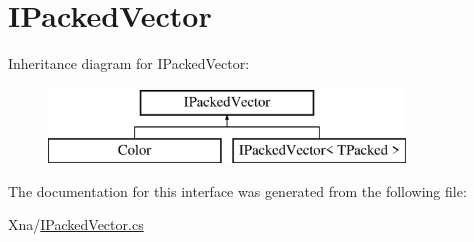 \hypertarget{interfaceMicrosoft_1_1Xna_1_1Framework_1_1IPackedVector}{}\section{I\+Packed\+Vector}
\label{interfaceMicrosoft_1_1Xna_1_1Framework_1_1IPackedVector}
Inheritance diagram for I\+Packed\+Vector\+:\begin{figure}[H]
\begin{center}
\leavevmode
\includegraphics[height=2.000000cm]{interfaceMicrosoft_1_1Xna_1_1Framework_1_1IPackedVector}
\end{center}
\end{figure}


The documentation for this interface was generated from the following file\+:\begin{DoxyCompactItemize}
\item 
Xna/\hyperlink{IPackedVector_8cs}{I\+Packed\+Vector.\+cs}\end{DoxyCompactItemize}
